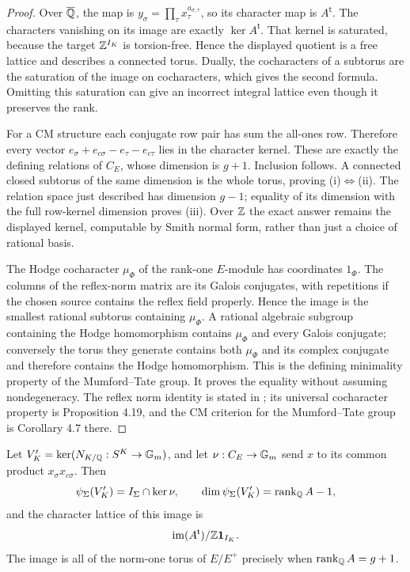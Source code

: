 \begin{proof}
Over $\overline{\mathbb Q}$, the map is
$y_\sigma=\prod_\tau x_\tau^{a_{\sigma,\tau}}$, so its character map
is $A^{\mathsf t}$.  The characters vanishing on its image are
exactly $\ker A^{\mathsf t}$.  That kernel is saturated, because the
target $\mathbb Z^{I_K}$ is torsion-free.  Hence the displayed quotient
is a free lattice and describes a connected torus.  Dually, the
cocharacters of a subtorus are the saturation of the image on
cocharacters, which gives the second formula.  Omitting this
saturation can give an incorrect integral lattice even though it
preserves the rank.

For a CM structure each conjugate row pair has sum the all-ones
row.  Therefore every vector
$e_\sigma+e_{c\sigma}-e_\tau-e_{c\tau}$ lies in the character
kernel.  These are exactly the defining relations of $C_E$, whose
dimension is $g+1$.  Inclusion follows.  A connected closed subtorus
of the same dimension is the whole torus, proving (i)$\Leftrightarrow$(ii).
The relation space just described has dimension $g-1$; equality of
its dimension with the full row-kernel dimension proves (iii).
Over $\mathbb Z$ the exact answer remains the displayed kernel, computable
by Smith normal form, rather than just a choice of rational basis.

The Hodge cocharacter $\mu_\Phi$ of the rank-one $E$-module has
coordinates $1_\Phi$.  The columns of the reflex-norm matrix are its
Galois conjugates, with repetitions if the chosen source contains
the reflex field properly.  Hence the image is the smallest rational
subtorus containing $\mu_\Phi$.  A rational algebraic subgroup
containing the Hodge homomorphism contains $\mu_\Phi$ and every
Galois conjugate; conversely the torus they generate contains both
$\mu_\Phi$ and its complex conjugate and therefore contains the
Hodge homomorphism.  This is the defining minimality property of
the Mumford--Tate group.  It proves the equality without assuming
nondegeneracy.  The reflex norm identity is stated in
\citet[Proposition 1.23 and \S4, p.~35]{DMilneCM2020}; its
universal cocharacter property is Proposition 4.19, and the CM
criterion for the Mumford--Tate group is Corollary 4.7 there.
\end{proof}

\begin{corollary}
\label{cor:d-compact-image}
Let $V'_K=\ker(N_{K/\mathbb Q}:S^K\to{\mathbb G_m})$, and let
$\nu:C_E\to{\mathbb G_m}$ send $x$ to its common product
$x_\sigma x_{c\sigma}$.  Then
\[
 \psi_\Sigma(V'_K)=I_\Sigma\cap\ker\nu,\qquad
 \dim\psi_\Sigma(V'_K)=\operatorname{rank}_\mathbb Q A-1,
\]
and the character lattice of this image is
\[
 \operatorname{im}(A^{\mathsf t})/\mathbb Z\mathbf1_{I_K}.
\]
The image is all of the norm-one torus of $E/E^+$ precisely when
$\operatorname{rank}_\mathbb Q A=g+1$.
\end{corollary}

